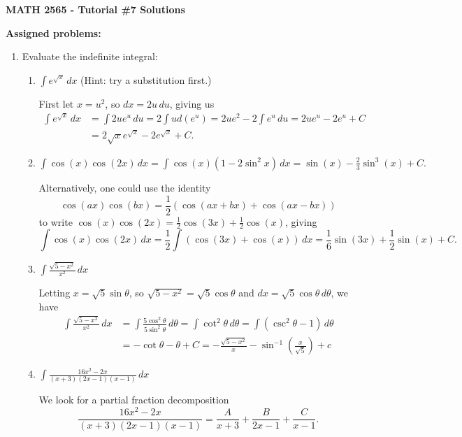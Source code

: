 \documentclass[12pt]{article}
\newcommand{\di}{\displaystyle}
\begin{document}
\author{Instructor: Sean Fitzpatrick}
\thispagestyle{empty}
\begin{center}
{\bf MATH 2565 - Tutorial \#7 Solutions}
\end{center}
\textbf{Assigned problems:}

 \begin{enumerate}
\item Evaluate the indefinite integral:
\begin{enumerate}

 \item $\di \int e^{\sqrt{x}}\,dx$ (Hint: try a substitution first.)

First let $x=u^2$, so $dx=2u\,du$, giving us
\begin{align*}
 \int e^{\sqrt{x}}\,dx &= \int 2ue^u\,du = 2\int u d(e^u) = 2ue^2-2\int e^u\,du = 2ue^u-2e^u+C\\
& = 2\sqrt{x}e^{\sqrt{x}}-2e^{\sqrt{x}}+C.
\end{align*}

 \item $\di \int \cos(x)\cos(2x)\,dx = \int \cos(x)(1-2\sin^2x)\,dx = \sin(x)-\frac{2}{3}\sin^3(x)+C.$

Alternatively, one could use the identity
\[
\cos(ax)\cos(bx)=\frac12\left(\cos(ax+bx)+\cos(ax-bx)\right)
\]
to write $\cos(x)\cos(2x) = \frac12 \cos(3x) + \frac12 \cos(x)$, giving
\[
\int \cos(x)\cos(2x)\,dx = \frac12 \int(\cos(3x)+\cos(x))\,dx = \frac16\sin(3x)+\frac12\sin(x)+C.
\]

 \item $\di \int \frac{\sqrt{5-x^2}}{x^2}\,dx$

\medskip

Letting $x=\sqrt{5}\sin\theta$, so $\sqrt{5-x^2} = \sqrt{5}\cos\theta$ and $dx = \sqrt{5}\cos\theta\,d\theta$, we have
\begin{align*}
 \int\frac{\sqrt{5-x^2}}{x^2}\,dx &= \int \frac{5\cos^2\theta}{5\sin^2\theta}\,d\theta = \int\cot^2\theta\,d\theta = \int (\csc^2\theta-1)\,d\theta\\
 & = -\cot\theta-\theta+C = -\frac{\sqrt{5-x^2}}{x}-\sin^{-1}\left(\frac{x}{\sqrt{5}}\right)+c
\end{align*}


 \item $\di \int \frac{16x^2-2x}{(x+3)(2x-1)(x-1)}\,dx$

We look for a partial fraction decomposition 
\[
\dfrac{16x^2-2x}{(x+3)(2x-1)(x-1)} = \dfrac{A}{x+3}+\dfrac{B}{2x-1}+\dfrac{C}{x-1}. 
\]



\end{enumerate}
\end{enumerate}
\end{document}
